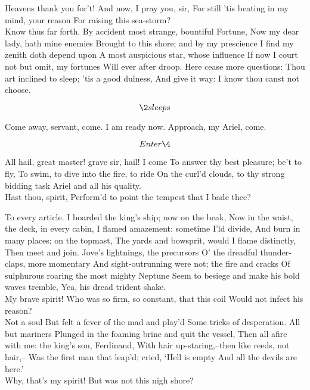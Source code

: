 \documentclass[11pt]{book}
\begin{document}
\2	Heavens thank you for't! And now, I pray you, sir,
	For still 'tis beating in my mind, your reason
	For raising this sea-storm? \\

\1	Know thus far forth.
	By accident most strange, bountiful Fortune,
	Now my dear lady, hath mine enemies
	Brought to this shore; and by my prescience
	I find my zenith doth depend upon
	A most auspicious star, whose influence
	If now I court not but omit, my fortunes
	Will ever after droop. Here cease more questions:
	Thou art inclined to sleep; 'tis a good dulness,
	And give it way: I know thou canst not choose.

	\[\2 sleeps\]

	Come away, servant, come. I am ready now.
	Approach, my Ariel, come.

	\[Enter \4\]

\4	All hail, great master! grave sir, hail! I come
	To answer thy best pleasure; be't to fly,
	To swim, to dive into the fire, to ride
	On the curl'd clouds, to thy strong bidding task
	Ariel and all his quality. \\

\1	Hast thou, spirit,
	Perform'd to point the tempest that I bade thee?

\4	To every article.
	I boarded the king's ship; now on the beak,
	Now in the waist, the deck, in every cabin,
	I flamed amazement: sometime I'ld divide,
	And burn in many places; on the topmast,
	The yards and bowsprit, would I flame distinctly,
	Then meet and join. Jove's lightnings, the precursors
	O' the dreadful thunder-claps, more momentary
	And sight-outrunning were not; the fire and cracks
	Of sulphurous roaring the most mighty Neptune
	Seem to besiege and make his bold waves tremble,
	Yea, his dread trident shake. \\

\1	My brave spirit!
	Who was so firm, so constant, that this coil
	Would not infect his reason? \\

\4	Not a soul
	But felt a fever of the mad and play'd
	Some tricks of desperation. All but mariners
	Plunged in the foaming brine and quit the vessel,
	Then all afire with me: the king's son, Ferdinand,
	With hair up-staring,--then like reeds, not hair,--
	Was the first man that leap'd; cried, `Hell is empty
	And all the devils are here.' \\

\1	Why, that's my spirit!
	But was not this nigh shore?  \\
\end{document}
